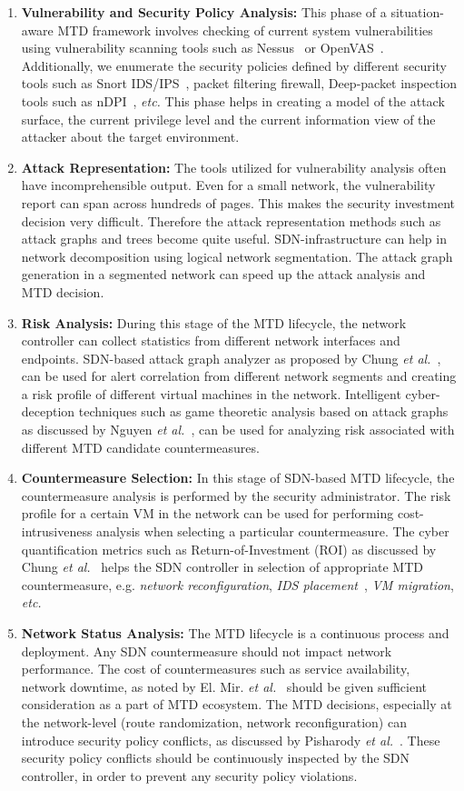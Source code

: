 \begin{enumerate}
    \item {\textbf{Vulnerability and Security Policy Analysis:}} This phase of a situation-aware MTD framework involves checking of current system vulnerabilities using vulnerability scanning tools such as Nessus~ or OpenVAS~. Additionally, we enumerate the security policies defined by different security tools such as Snort IDS/IPS~, packet filtering firewall, Deep-packet inspection tools such as nDPI~, {\em etc.} This phase helps in creating a model of the attack surface, the current privilege level and the current information view of the attacker about the target environment.
    \item {\textbf{Attack Representation:}}
    The tools utilized for vulnerability analysis often have incomprehensible output. Even for a small network, the vulnerability report can span across hundreds of pages. This makes the security investment decision very difficult. Therefore the attack representation methods such as attack graphs and trees become quite useful. SDN-infrastructure can help in network decomposition using logical network segmentation. The attack graph generation in a segmented network can speed up the attack analysis and MTD decision. 
    \item {\textbf{Risk Analysis:}}
    During this stage of the MTD lifecycle, the network controller can collect statistics from different network interfaces and endpoints. SDN-based attack graph analyzer as proposed by Chung \textit{et al.}~, can be used for alert correlation from different network segments and creating a risk profile of different virtual machines in the network. Intelligent cyber-deception techniques such as game theoretic analysis based on attack graphs as discussed by Nguyen \textit{et al.}~, can be used for analyzing risk associated with different MTD candidate countermeasures.
    \item {\textbf{Countermeasure Selection:}}
    In this stage of SDN-based MTD lifecycle, the countermeasure analysis is performed by the security administrator. The risk profile for a certain VM in the network can be used for performing cost-intrusiveness analysis when selecting a particular countermeasure. The cyber quantification metrics such as Return-of-Investment (ROI) as discussed by Chung \textit{et al.}~ helps the SDN controller in selection of appropriate MTD countermeasure, e.g. \textit{network reconfiguration}, \textit{IDS placement}~, \textit{VM migration}, {\em etc.} 
    \item {\textbf{Network Status Analysis:}}
    The MTD lifecycle is a continuous process and deployment. Any SDN countermeasure should not impact network performance. The cost of countermeasures such as service availability, network downtime, as noted by El. Mir. \textit{et al.}~ should be given sufficient consideration as a part of MTD ecosystem. The MTD decisions, especially at the network-level (route randomization, network reconfiguration) can introduce security policy conflicts, as discussed by Pisharody \textit{et al.}~. These security policy conflicts should be continuously inspected by the SDN controller, in order to prevent any security policy violations. 
    \end{enumerate}

